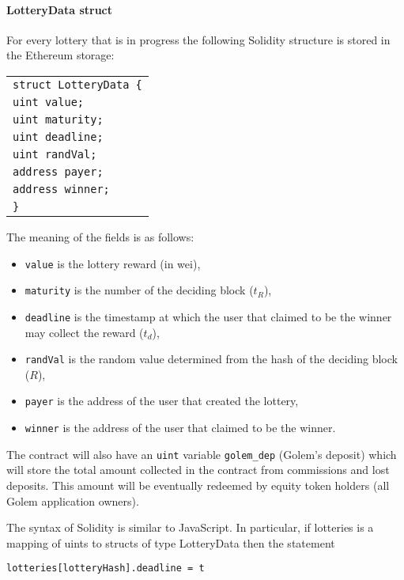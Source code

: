 \documentclass[a4paper]{article}
\begin{document}
    \paragraph{LotteryData struct}

    For every lottery that is in progress the following Solidity structure is stored in the Ethereum storage:

    \begin{tabular}{l}
        \texttt{struct LotteryData \{}\\
        \qquad\texttt{uint value;}\\
        \qquad\texttt{uint maturity;}\\
        \qquad\texttt{uint deadline;}\\
        \qquad\texttt{uint randVal;}\\
        \qquad\texttt{address payer;}\\
        \qquad\texttt{address winner;}\\
        \texttt{\}}
    \end{tabular}

    The meaning of the fields is as follows:
    \begin{itemize}
        \item \texttt{value} is the lottery reward (in wei),
        \item \texttt{maturity} is the number of the deciding block ($t_R$),
        \item \texttt{deadline} is the timestamp at which the user that claimed to be the winner may collect
            the reward ($t_d$),
        \item \texttt{randVal} is the random value determined from the hash of the deciding block ($R$),
        \item \texttt{payer} is the address of the user that created the lottery,
        \item \texttt{winner} is the address of the user that claimed to be the winner.
    \end{itemize}

    The contract will also have an \texttt{uint} variable \texttt{golem\_dep} (Golem's deposit) which will store
    the total amount collected in the contract from commissions and lost deposits. This amount will be eventually
    redeemed by equity token holders (all Golem application owners).

    The syntax of Solidity is similar to JavaScript. In particular, if lotteries is a mapping of uints to structs of type LotteryData then the statement
    \begin{center}
        \texttt{lotteries[lotteryHash].deadline = t}
    \end{center}
\end{document}
